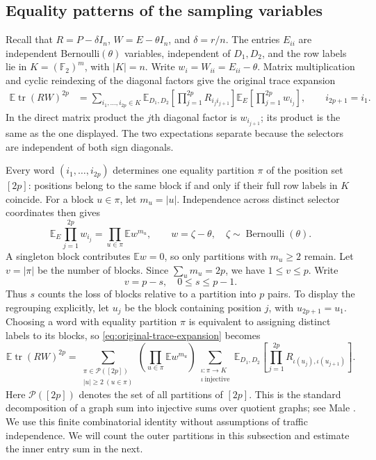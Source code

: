 \documentclass[11pt]{article}
\theoremstyle{definition}
\theoremstyle{remark}
\theoremstyle{plain}
\newcommand{\E}{\mathbb E}
\DeclareMathOperator{\tr}{tr}
\begin{document}
\subsection{Equality patterns of the sampling variables}\label{sec:equality-patterns}

Recall that $R=P-\delta I_n$, $W=E-\theta I_n$, and
$\delta=r/n$. The entries $E_{ii}$ are independent
Bernoulli$(\theta)$ variables, independent of $D_1,D_2$, and the row
labels lie in $K=(\mathbb F_2)^m$, with $|K|=n$. Write
$w_i=W_{ii}=E_{ii}-\theta$. Matrix multiplication and cyclic
reindexing of the diagonal factors give the original trace expansion
\begin{equation}\label{eq:original-trace-expansion}
\begin{split}
 \E\tr(RW)^{2p}
   &=\sum_{i_1,\ldots,i_{2p}\in K}
       \E_{D_1,D_2}\!\left[
                 \prod_{j=1}^{2p}R_{i_j i_{j+1}}\right]
       \E_E\!\left[\prod_{j=1}^{2p}w_{i_j}\right],
 \qquad i_{2p+1}=i_1.
\end{split}
\end{equation}
In the direct matrix product the $j$th diagonal factor is
$w_{i_{j+1}}$; its product is the same as the one displayed.
The two expectations separate because the selectors are independent
of both sign diagonals.

Every word $(i_1,\ldots,i_{2p})$ determines one equality partition
$\pi$ of the position set $[2p]$: positions belong to the same
block if and only if their full row labels in $K$ coincide.
For a block $u\in\pi$, let $m_u=|u|$. Independence across distinct
selector coordinates then gives
\[
 \E_E\prod_{j=1}^{2p}w_{i_j}
      =\prod_{u\in\pi}\E w^{m_u},
 \qquad w=\zeta-\theta,\quad \zeta\sim\operatorname{Bernoulli}(\theta).
\]
A singleton block contributes $\E w=0$, so only partitions with
\(m_u\ge2\) remain. Let $v=|\pi|$ be the number of blocks.
Since $\sum_u m_u=2p$, we have $1\le v\le p$. Write
\[
 v=p-s,\quad 0\le s\le p-1.
\]
Thus $s$ counts the loss of blocks relative to a partition into $p$
pairs. To display the regrouping explicitly, let $u_j$ be the block
containing position $j$, with $u_{2p+1}=u_1$. Choosing a word with
equality partition $\pi$ is equivalent to assigning distinct labels
to its blocks, so \eqref{eq:original-trace-expansion} becomes
\[
 \E\tr(RW)^{2p}
 =\sum_{\substack{\pi\in\mathcal P([2p])\\ |u|\ge2\ (u\in\pi)}}
   \left(\prod_{u\in\pi}\E w^{m_u}\right)
   \sum_{\substack{\iota:\pi\to K\\ \iota\ \mathrm{injective}}}
   \E_{D_1,D_2}\!\left[
      \prod_{j=1}^{2p}R_{\iota(u_j),\iota(u_{j+1})}\right].
\]
Here $\mathcal P([2p])$ denotes the set of all partitions of $[2p]$.
This is the standard decomposition of a graph sum into injective
sums over quotient graphs; see Male
\cite[Definition~2.5 and Eq.~(2.2)]{male_traffic}.
We use this finite combinatorial identity without assumptions of
traffic independence.
We will count the outer partitions in this subsection and estimate
the inner entry sum in the next.
\end{document}
